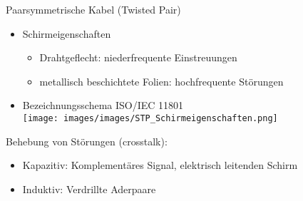     \begin{definition}{Paarsymmetrische Kabel (Twisted Pair)}
        \begin{itemize}
            \item Schirmeigenschaften
            \begin{itemize}
                \item Drahtgeflecht: niederfrequente Einstreuungen
                \item metallisch beschichtete Folien: hochfrequente Störungen
            \end{itemize}
            \item Bezeichnungsschema ISO/IEC 11801\\
            \texttt{[image: images/images/STP\_Schirmeigenschaften.png]}
        \end{itemize}
        Behebung von Störungen (crosstalk):
        \begin{itemize}
            \item Kapazitiv: Komplementäres Signal, elektrisch leitenden Schirm
            \item Induktiv: Verdrillte Aderpaare
        \end{itemize}
    \end{definition}

    

    
        
    